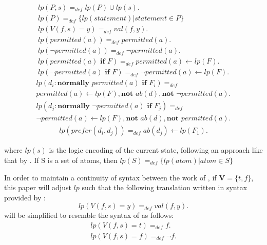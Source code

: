 \begin{gather}
    lp(P,s) =_{def} lp(P)\cup lp(s). \label{eq:apl_lp_01} \\
    lp(P)=_{def}\{lp(statement) | statement \in P\} \label{eq:apl_lp_02} \\
    lp\left(V(f,s)=y\right) =_{def}
        val\left(f,y\right). \label{eq:apl_lp_03} \\
    lp(permitted(a)) =_{def}
        permitted(a). \label{eq:apl_lp_04} \\
    lp(\neg permitted(a)) =_{def}
        \neg permitted(a). \label{eq:apl_lp_05} \\
    lp(permitted(a) \textbf{ if } F) =_{def}
        permitted(a) \leftarrow
            lp(F). \label{eq:apl_lp_06} \\
    lp(\neg permitted(a) \textbf{ if } F) =_{def}
        \neg permitted(a) \leftarrow
            lp(F). \label{eq:apl_lp_07}
\end{gather}
\begin{multline}
    \label{eq:apl_lp_08}
    lp(d_i: \textbf{normally } permitted(a) \textbf{ if } F_i) =_{def} \\
        permitted(a) \leftarrow
            lp(F),
            \textbf{not } ab(d),
            \textbf{not } \neg permitted(a).
\end{multline}
\begin{multline}
    \label{eq:apl_lp_09}
    lp(d_j: \textbf{normally } \neg permitted(a) \textbf{ if } F_j) =_{def} \\
        \neg permitted(a) \leftarrow
        lp(F),
        \textbf{not } ab(d),
        \textbf{not } permitted(a).
\end{multline}
\begin{gather}
    lp(prefer(d_i, d_j)) =_{def}
        ab(d_j) \leftarrow lp(F_1). \label{eq:apl_lp_10}
\end{gather}

\noindent
where $lp(s)$ is the logic encoding of the current state, following an approach like that by \citet{balduccini_aaa_2008}.
If S is a set of atoms, then $lp(S)=_{def}\{lp(atom) | atom \in S\}$

In order to maintain a continuity of syntax between the work of \citet{gelfond_action_1998,balduccini_aaa_2008,blount_architecture_2013,gelfond_authorization_2008}, if $\boldsymbol{V} = \{t,f\}$, this paper will adjust $lp$ such that the following translation written in syntax provided by \citet{gelfond_authorization_2008}:
\[
    lp\left(V(f,s)=y\right) =_{def}
        val\left(f,y\right).
\]
will be simplified to resemble the syntax of \citet{gelfond_action_1998,balduccini_aaa_2008,blount_architecture_2013} as follows:
\begin{gather}
    lp\left(V(f,s)=t\right) =_{def}
        f. \\
    lp\left(V(f,s)=f\right) =_{def}
        \neg f. \\
\end{gather}

